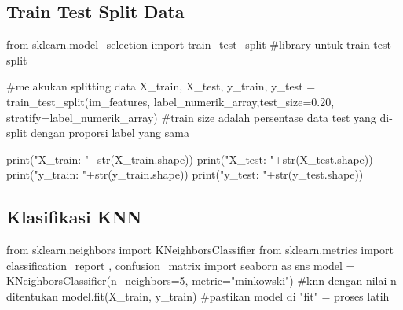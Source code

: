\documentclass[
  letterpaper,
  DIV=11,
  numbers=noendperiod]{scrreprt}
\newenvironment{Shaded}{\begin{snugshade}}{\end{snugshade}}
\newcommand{\BuiltInTok}[1]{\textcolor[rgb]{0.00,0.23,0.31}{#1}}
\newcommand{\CommentTok}[1]{\textcolor[rgb]{0.37,0.37,0.37}{#1}}
\newcommand{\DecValTok}[1]{\textcolor[rgb]{0.68,0.00,0.00}{#1}}
\newcommand{\FloatTok}[1]{\textcolor[rgb]{0.68,0.00,0.00}{#1}}
\newcommand{\ImportTok}[1]{\textcolor[rgb]{0.00,0.46,0.62}{#1}}
\newcommand{\NormalTok}[1]{\textcolor[rgb]{0.00,0.23,0.31}{#1}}
\newcommand{\OperatorTok}[1]{\textcolor[rgb]{0.37,0.37,0.37}{#1}}
\newcommand{\StringTok}[1]{\textcolor[rgb]{0.13,0.47,0.30}{#1}}
\begin{document}
\hypertarget{train-test-split-data-1}{%
\subsection*{Train Test Split Data}\label{train-test-split-data-1}}

\begin{Shaded}
\begin{Highlighting}[]
\ImportTok{from}\NormalTok{ sklearn.model\_selection }\ImportTok{import}\NormalTok{ train\_test\_split }\CommentTok{\#library untuk train test split}

\CommentTok{\#melakukan splitting data}
\NormalTok{X\_train, X\_test, y\_train, y\_test }\OperatorTok{=}\NormalTok{ train\_test\_split(im\_features, label\_numerik\_array,test\_size}\OperatorTok{=}\FloatTok{0.20}\NormalTok{, stratify}\OperatorTok{=}\NormalTok{label\_numerik\_array) }
\CommentTok{\#train size adalah persentase data test yang di{-}split dengan proporsi label yang sama}

\BuiltInTok{print}\NormalTok{(}\StringTok{"X\_train: "}\OperatorTok{+}\BuiltInTok{str}\NormalTok{(X\_train.shape))}
\BuiltInTok{print}\NormalTok{(}\StringTok{"X\_test: "}\OperatorTok{+}\BuiltInTok{str}\NormalTok{(X\_test.shape))}
\BuiltInTok{print}\NormalTok{(}\StringTok{"y\_train: "}\OperatorTok{+}\BuiltInTok{str}\NormalTok{(y\_train.shape))}
\BuiltInTok{print}\NormalTok{(}\StringTok{"y\_test: "}\OperatorTok{+}\BuiltInTok{str}\NormalTok{(y\_test.shape))}
\end{Highlighting}
\end{Shaded}

\hypertarget{klasifikasi-knn-1}{%
\subsection*{Klasifikasi KNN}\label{klasifikasi-knn-1}}

\begin{Shaded}
\begin{Highlighting}[]
\ImportTok{from}\NormalTok{ sklearn.neighbors }\ImportTok{import}\NormalTok{ KNeighborsClassifier}
\ImportTok{from}\NormalTok{ sklearn.metrics }\ImportTok{import}\NormalTok{ classification\_report , confusion\_matrix}
\ImportTok{import}\NormalTok{ seaborn }\ImportTok{as}\NormalTok{ sns}
\NormalTok{model }\OperatorTok{=}\NormalTok{ KNeighborsClassifier(n\_neighbors}\OperatorTok{=}\DecValTok{5}\NormalTok{, metric}\OperatorTok{=}\StringTok{"minkowski"}\NormalTok{) }\CommentTok{\#knn dengan nilai n ditentukan}
\NormalTok{model.fit(X\_train, y\_train) }\CommentTok{\#pastikan model di "fit" = proses latih}
\end{Highlighting}
\end{Shaded}
\end{document}
